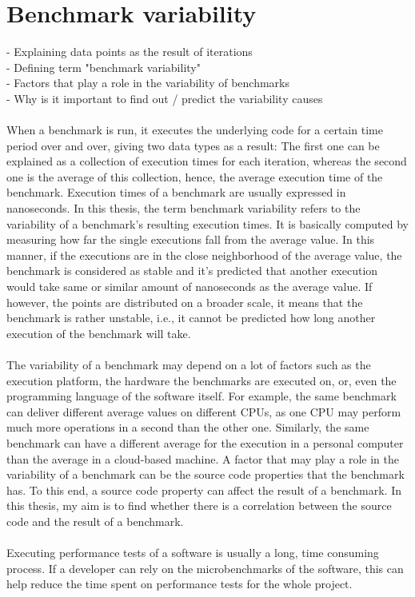 \documentclass{seal_thesis}
\begin{document}
\section{Benchmark variability}
- Explaining data points as the result of iterations \\
- Defining term "benchmark variability" \\
- Factors that play a role in the variability of benchmarks\\
- Why is it important to find out / predict the variability causes \\
\\
When a benchmark is run, it executes the underlying code for a certain time period over and over, giving two data types as a result: The first one can be explained as a collection of execution times for each iteration, whereas the second one is the average of this collection, hence, the average execution time of the benchmark. Execution times of a benchmark are usually expressed in nanoseconds. In this thesis, the term benchmark variability refers to the variability of a benchmark's resulting execution times. It is basically computed by measuring how far the single executions fall from the average value. In this manner, if the executions are in the close neighborhood of the average value, the benchmark is considered as stable and it's predicted that another execution would take same or similar amount of nanoseconds as the average value. If however, the points are distributed on a broader scale, it means that the benchmark is rather unstable, i.e., it cannot be predicted how long another execution of the benchmark will take.\\
\\
The variability of a benchmark may depend on a lot of factors such as the execution platform, the hardware the benchmarks are executed on, or, even the programming language of the software itself. For example, the same benchmark can deliver different average values on different CPUs, as one CPU may perform much more operations in a second than the other one. Similarly, the same benchmark can have a different average for the execution in a personal computer than the average in a cloud-based machine. A factor that may play a role in the variability of a benchmark can be the source code properties that the benchmark has. To this end, a source code property can affect the result of a benchmark. In this thesis, my aim is to find whether there is a correlation between the source code and the result of a benchmark.\\
\\
Executing performance tests of a software is usually a long, time consuming process. If a developer can rely on the microbenchmarks of the software, this can help reduce the time spent on performance tests for the whole project. 
\end{document}
